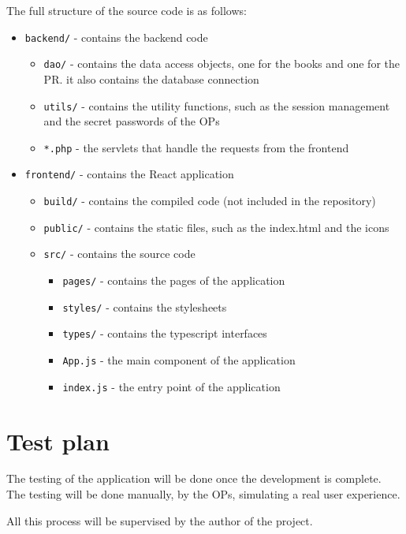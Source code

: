 The full structure of the source code is as follows:
\begin{itemize}[label={}]
    \item \texttt{backend/} - contains the backend code
          \begin{itemize}[label={}]
              \item \texttt{dao/} - contains the data access objects, one for the books and one for the PR. it also contains the database connection
              \item \texttt{utils/} - contains the utility functions, such as the session management and the secret passwords of the OPs
              \item \texttt{*.php} - the servlets that handle the requests from the frontend
          \end{itemize}
    \item \texttt{frontend/} - contains the React application
          \begin{itemize}[label={}]
              \item \texttt{build/} - contains the compiled code (not included in the repository)
              \item \texttt{public/} - contains the static files, such as the index.html and the icons
              \item \texttt{src/} - contains the source code
                    \begin{itemize}[label={}]
                        \item \texttt{pages/} - contains the pages of the application
                        \item \texttt{styles/} - contains the stylesheets
                        \item \texttt{types/} - contains the typescript interfaces
                        \item \texttt{App.js} - the main component of the application
                        \item \texttt{index.js} - the entry point of the application
                    \end{itemize}
          \end{itemize}
\end{itemize}

\section{Test plan}

The testing of the application will be done once the development is complete. The testing will be done manually, by the OPs, simulating a real user experience.

All this process will be supervised by the author of the project.